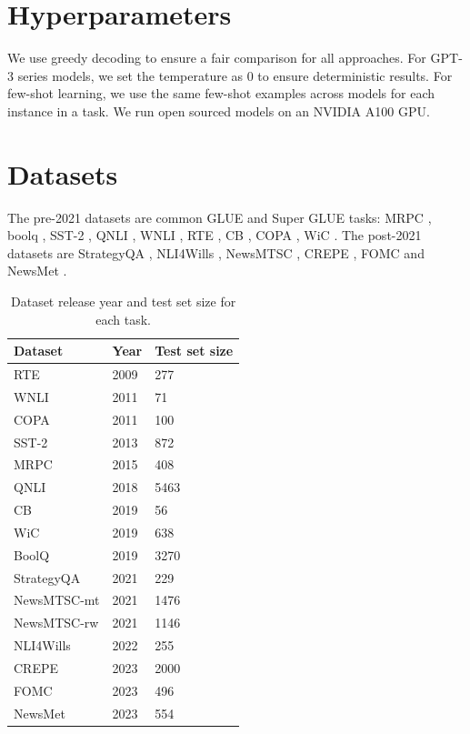 \documentclass[letterpaper]{article} %
\newcommand{\jmf}[1]{}      %
\begin{document}

\appendix

\section{Hyperparameters}
\label{app:hyperparameters}
We use greedy decoding to ensure a fair comparison for all approaches. For GPT-3 series models, we set the temperature as 0 to ensure deterministic results. For few-shot learning, we use the same few-shot examples across models for each instance in a task. We run open sourced models on an NVIDIA A100 GPU.


\section{Datasets}
\label{app:datasets}
\jmf{update}The pre-2021 datasets are common GLUE \cite{wang2018} and Super GLUE \cite{Wang2019} tasks: MRPC \cite{dolan-brockett-2005}, boolq \cite{clark2019}, SST-2 \cite{socher2013}, QNLI \cite{Demszky2018}, WNLI \cite{levesque2012}, RTE \cite{Giampiccolo2008}, CB \cite{Marneffe2019}, COPA \cite{roemmele2011}, WiC \cite{pilehvar2019}. The post-2021 datasets are StrategyQA \cite{geva2021},  NLI4Wills \cite{kwak2022}, NewsMTSC \cite{hamborg2021}, CREPE \cite{yu2023}, FOMC \cite{shah2023} and NewsMet \cite{joseph2023}.

\begin{table}[h!]
\centering \small
\begin{tabular}{l||ll}
Dataset & Year  & Test set size\\ \hline \hline
RTE & 2009  & 277 \\
WNLI & 2011 & 71\\
COPA & 2011  & 100\\
SST-2 & 2013 & 872\\
MRPC & 2015  & 408 \\
QNLI & 2018  & 5463\\
CB &  2019 & 56\\
WiC & 2019  & 638\\
BoolQ &  2019 & 3270\\
\hline \hline
StrategyQA &  2021  & 229\\
NewsMTSC-mt & 2021 & 1476\\
NewsMTSC-rw & 2021 & 1146\\
NLI4Wills & 2022 & 255\\
CREPE & 2023 & 2000 \\
FOMC & 2023 &496\\
NewsMet& 2023 &554

\end{tabular}
\caption[]{Dataset release year and test set size for each task.}
\label{tab-size-year-llm}
\end{table}
\end{document}
